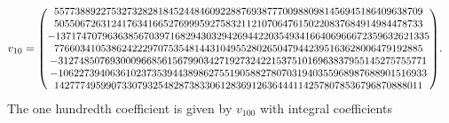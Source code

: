 \documentclass[pdftex]{sigma}
\numberwithin{equation}{section}
\begin{document}
\begin{align*}
&v_{10} = \text{\small $\left( \begin{matrix}55773889227532732828184524484609228876938777009880981456945186409638709\\ 50550672631241763416652769995927583211210706476150220837684914984478733\\ -137174707963638567039716829430329426944220354934166406966672359632621335\\ 77660341053862422297075354814431049552802650479442395163628006479192885\\ -31274850769300096685615679903427192732422153751016963837955145275755771\\ -10622739406361023735394438986275519058827807031940355968987688901516933\\ 14277749599073307932548287383306128369126364441142578078536796870888011\end{matrix} \right)$}.
\end{align*}
The one hundredth coefficient is given by $v_{100}$ with integral coefficients
\end{document}
